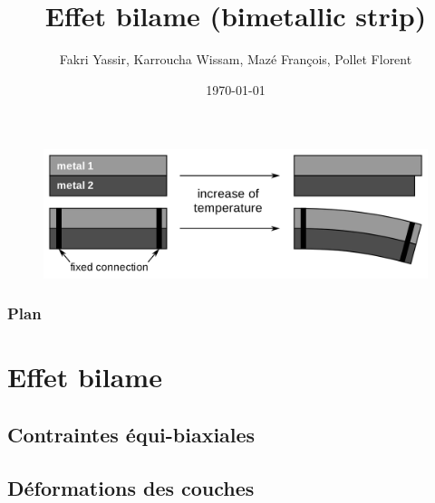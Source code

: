 \documentclass[10pt]{beamer}
\title[Effet bilame]{Effet bilame (bimetallic strip)}
\author[Groupe 4]{Fakri Yassir, Karroucha Wissam, Mazé François, Pollet Florent} %
\institute[Mines Paris] %
{
Mines ParisTech \\ %
}
\date{\today} %
\begin{document}
\begin{frame}
\titlepage %
\begin{figure}
    \centering
    \includegraphics[scale=0.1]{imgs/bilame.png}
\end{figure}
\end{frame}

\begin{frame}
\frametitle{Plan} %
\tableofcontents %
\end{frame}

\section{Effet bilame} %

\subsection{Contraintes équi-biaxiales} 
\subsection{Déformations des couches} 
\end{document}
